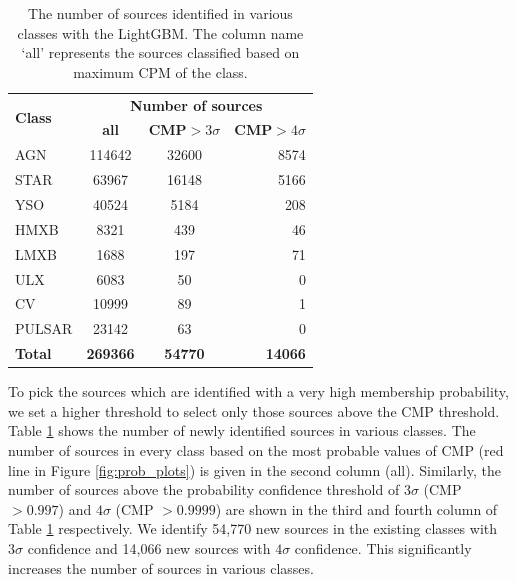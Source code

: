 \documentclass[fleqn,usenatbib]{mnras}
\begin{document}
    
     \begin{table}
        \centering
        \caption{The number of sources identified in various classes with the LightGBM. The column name `all' represents the sources classified based on maximum CPM of the class.}
        \label{tab:new-src}
        \begin{tabular}{lccr}
        \hline
        \multirow{2}{*}{\textbf{Class}} & \multicolumn{3}{c}{\textbf{Number of sources}}                    \\
                                        & \textbf{all}    & \textbf{CMP$>3\sigma$} & \textbf{CMP$>4\sigma$} \\ \hline
        AGN                             & 114642          & 32600                  & 8574                   \\
        STAR                            & 63967           & 16148                  & 5166                   \\
        YSO                             & 40524           & 5184                   & 208                    \\
        HMXB                            & 8321            & 439                    & 46                     \\
        LMXB                            & 1688            & 197                    & 71                     \\
        ULX                             & 6083            & 50                     & 0                      \\
        CV                              & 10999           & 89                     & 1                      \\
        PULSAR                          & 23142           & 63                     & 0                      \\
        \textbf{Total}                  & \textbf{269366} & \textbf{54770}         & \textbf{14066}         \\ \hline
        \end{tabular}
    \end{table}
    To pick the sources which are identified with a very high membership probability, we set a higher threshold to select only those sources above the CMP threshold.
    Table \ref{tab:new-src} shows the number of newly identified sources in various classes. The number of sources in every class based on the most probable values of CMP (red line in Figure \ref{fig:prob_plots}) is given in the second column (all). Similarly, the number of sources above the probability confidence threshold of $3 \sigma$ (CMP $> 0.997$) and $4 \sigma$ (CMP $> 0.9999$) are shown in the third and fourth column of Table \ref{tab:new-src} respectively. We identify 54,770 new sources in the existing classes with $3 \sigma$ confidence and 14,066 new sources with $4 \sigma$ confidence. This significantly increases the number of sources in various classes.
    
\end{document}

